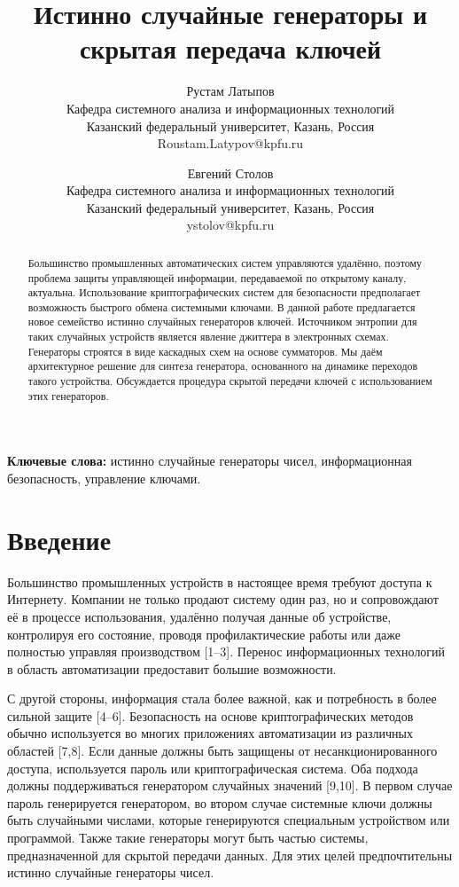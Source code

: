 \documentclass[a4paper,12pt]{article}
\title{Истинно случайные генераторы и скрытая передача ключей}
\author{Рустам Латыпов \\ 
Кафедра системного анализа и информационных технологий \\
Казанский федеральный университет, Казань, Россия \\
Roustam.Latypov@kpfu.ru \and
Евгений Столов \\
Кафедра системного анализа и информационных технологий \\
Казанский федеральный университет, Казань, Россия \\
ystolov@kpfu.ru}
\date{}
\begin{document}
\maketitle

\begin{abstract}
Большинство промышленных автоматических систем управляются удалённо, поэтому проблема защиты управляющей информации, передаваемой по открытому каналу, актуальна. Использование криптографических систем для безопасности предполагает возможность быстрого обмена системными ключами. В данной работе предлагается новое семейство истинно случайных генераторов ключей. Источником энтропии для таких случайных устройств является явление джиттера в электронных схемах. Генераторы строятся в виде каскадных схем на основе сумматоров. Мы даём архитектурное решение для синтеза генератора, основанного на динамике переходов такого устройства. Обсуждается процедура скрытой передачи ключей с использованием этих генераторов.
\end{abstract}

\textbf{Ключевые слова:} истинно случайные генераторы чисел, информационная безопасность, управление ключами.

\section{Введение}

Большинство промышленных устройств в настоящее время требуют доступа к Интернету. Компании не только продают систему один раз, но и сопровождают её в процессе использования, удалённо получая данные об устройстве, контролируя его состояние, проводя профилактические работы или даже полностью управляя производством [1--3]. Перенос информационных технологий в область автоматизации предоставит большие возможности.

С другой стороны, информация стала более важной, как и потребность в более сильной защите [4--6]. Безопасность на основе криптографических методов обычно используется во многих приложениях автоматизации из различных областей [7,8]. Если данные должны быть защищены от несанкционированного доступа, используется пароль или криптографическая система. Оба подхода должны поддерживаться генератором случайных значений [9,10]. В первом случае пароль генерируется генератором, во втором случае системные ключи должны быть случайными числами, которые генерируются специальным устройством или программой. Также такие генераторы могут быть частью системы, предназначенной для скрытой передачи данных. Для этих целей предпочтительны истинно случайные генераторы чисел.
\end{document}
